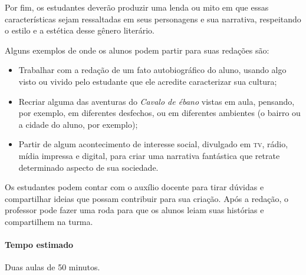 \documentclass[11pt]{extarticle}
\begin{document}
Por fim, os estudantes deverão produzir uma lenda ou mito em que essas características sejam ressaltadas em seus personagens e sua narrativa, respeitando o estilo e a estética desse gênero literário.

Alguns exemplos de onde os alunos podem partir para suas redações são:

\begin{itemize}
\item Trabalhar com a redação de um fato autobiográfico do aluno, usando algo visto ou vivido pelo estudante que ele acredite caracterizar sua cultura;

\item Recriar alguma das aventuras do \textit{Cavalo de ébano} vistas em aula, pensando, por exemplo, em diferentes desfechos, ou em diferentes ambientes (o bairro ou a cidade do aluno, por exemplo);

\item Partir de algum acontecimento de interesse social, divulgado em \textsc{tv}, rádio, mídia impressa e digital, para criar uma narrativa fantástica que retrate determinado aspecto de sua sociedade.
\end{itemize}

Os estudantes podem contar com o auxílio docente para tirar dúvidas e compartilhar ideias que possam contribuir para sua criação. Após a redação, o professor pode fazer uma roda para que os alunos leiam suas histórias e compartilhem na turma.

\paragraph{Tempo estimado} Duas aulas de 50 minutos.
\end{document}
